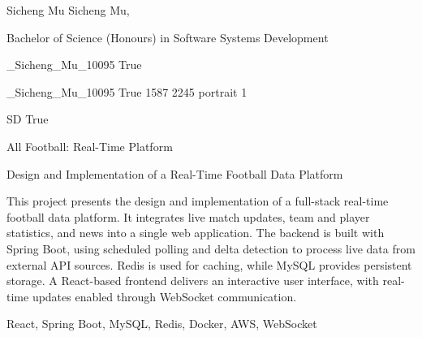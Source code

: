 \documentclass[twoside]{report}
\begin{document}
\begingroup{}\relax



\def\Key{_Sicheng_Mu_10095}

{Sicheng Mu}
{Sicheng Mu, }

{Bachelor of Science (Honours) in Software Systems Development}

{_Sicheng_Mu_10095}
{True}

{_Sicheng_Mu_10095}
{True}
{1587}
{2245}
{portrait}
{1}

{SD}
{True}

{All Football: Real-Time Platform}

{Design and Implementation of a Real-Time Football Data Platform}

{This project presents the design and implementation of a full-stack real-time football data platform. It integrates live match updates, team and player statistics, and news into a single web application. The backend is built with Spring Boot, using scheduled polling and delta detection to process live data from external {API} sources. Redis is used for caching, while MySQL provides persistent storage. A React-based frontend delivers an interactive user interface, with real-time updates enabled through WebSocket communication.}

{React, Spring Boot, MySQL, Redis, Docker, AWS, WebSocket}
\end{document}
